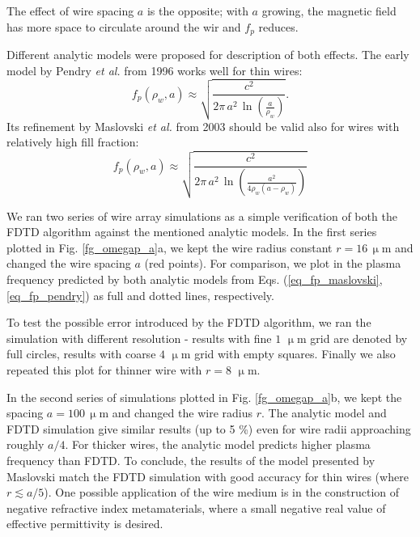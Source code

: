 The effect of wire spacing $a$ is the opposite; with $a$ growing, the magnetic field has more space to circulate around the wir and $f_p$ reduces. 

Different analytic models were proposed for description of both effects. The early model by Pendry \textit{et al.} from 1996 \cite{pendry1996extremely} works well for thin wires: 
\begin{equation} f_p(\rho_w,a) \approx \sqrt{\frac{c^2}{2\pi \, a^2 \, \ln(\frac{a}{\rho_w})}}. \label{eq_fp_pendry}\end{equation}
Its refinement by Maslovski \textit{et al.} from 2003 \cite{maslovski2002wire} should be valid also for wires with relatively high fill fraction:
\begin{equation} f_p(\rho_w,a) \approx \sqrt{\frac{c^2}{2\pi \, a^2 \, \ln\left(\frac{a^2}{4\rho_w (a-\rho_w)}\right)}} \label{eq_fp_maslovski}\end{equation}

We ran two series of wire array simulations as a simple verification of both the FDTD algorithm against the mentioned analytic models. In the first series plotted in Fig. \ref{fg_omegap_a}a, we kept the wire radius constant $r = 16\,\upmu$m  and changed the wire spacing $a$ (red points). For comparison, we plot in the plasma frequency predicted by both analytic models from Eqs. (\ref{eq_fp_maslovski}, \ref{eq_fp_pendry}) as full and dotted lines, respectively. 

To test the possible error introduced by the FDTD algorithm, we ran the simulation with different resolution - results with fine $1$ $\upmu$m grid are denoted by full circles, results with coarse $4$ $\upmu$m grid with empty squares. Finally we also repeated this plot for thinner wire with $r = 8$ $\upmu$m. %

In the second series of simulations plotted in Fig.  \ref{fg_omegap_a}b, we kept the spacing $a = 100\,\upmu$m and changed the wire radius $r$. The analytic model and FDTD simulation give similar results (up to 5 \%) even for wire radii approaching roughly $a/4$. For thicker wires, the analytic model predicts higher plasma frequency than FDTD.  To conclude, the results of the model presented by Maslovski match the FDTD simulation with good accuracy for thin wires (where $r \lesssim a/5$). One possible application of the wire medium is in the construction of negative refractive index metamaterials, where a small negative real value of effective permittivity is desired.%

